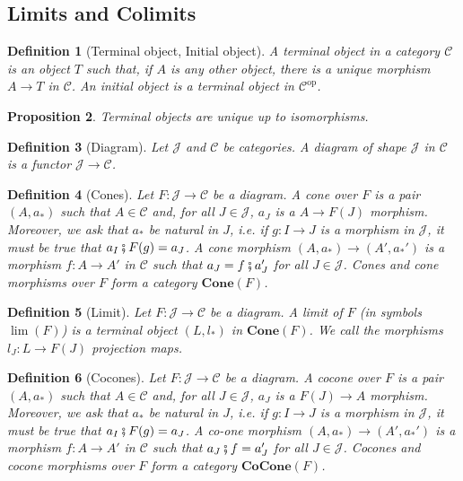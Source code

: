 \documentclass[11pt,a4paper,openright,twoside]{report}
\theoremstyle{plain}
\newtheorem{proposition}{Proposition}
\newtheorem{definition}[proposition]{Definition}
\theoremstyle{definition}
\begin{document}
\subsection{Limits and Colimits}

\begin{definition}[Terminal object, Initial object]
  A terminal object in a category $\mathcal{C}$ is an object $T$ such that, if $A$ is any other object, there is a unique morphism $A \to T$ in $\mathcal{C}$. An initial object is a terminal object in $\mathcal{C}^{\mathrm{op}}$.
\end{definition}

\begin{proposition}
  Terminal objects are unique up to isomorphisms.
\end{proposition}

\begin{definition}[Diagram]
  Let $\mathcal{J}$ and $\mathcal{C}$ be categories. A diagram of shape $\mathcal{J}$ in $\mathcal{C}$ is a functor $\mathcal{J} \to \mathcal{C}$.
\end{definition}

\begin{definition}[Cones]
  Let $F: \mathcal{J} \to \mathcal{C}$ be a diagram. A cone over $F$ is a pair $(A,a_*)$ such that $A \in \mathcal{C}$ and, for all $J \in \mathcal{J}$, $a_J$ is a $A \to F(J)$ morphism. Moreover, we ask that $a_*$ be natural in $J$, i.e. if $g: I \to J$ is a morphism in $\mathcal{J}$, it must be true that $a_I \fatsemi F(g) = a_J$.
  A cone morphism $(A, a_*) \to (A', a_*')$ is a morphism $f: A \to A'$ in $\mathcal{C}$ such that $a_J = f \fatsemi a_J'$ for all $J \in \mathcal{J}$. 
  Cones and cone morphisms over $F$ form a category $\mathbf{Cone}(F)$.
\end{definition}

\begin{definition}[Limit]
  Let $F: \mathcal{J} \to \mathcal{C}$ be a diagram. A limit of $F$ (in symbols $\lim(F)$) is a terminal object $(L, l_{*})$ in $\mathbf{Cone}(F)$. We call the morphisms $l_J: L \to F(J)$ projection maps.
\end{definition}

\begin{definition}[Cocones]
  Let $F: \mathcal{J} \to \mathcal{C}$ be a diagram. A cocone over $F$ is a pair $(A,a_*)$ such that $A \in \mathcal{C}$ and, for all $J \in \mathcal{J}$, $a_J$ is a $F(J) \to A$ morphism. Moreover, we ask that $a_*$ be natural in $J$, i.e. if $g: I \to J$ is a morphism in $\mathcal{J}$, it must be true that $a_I \fatsemi F(g) = a_J$.
  A co-one morphism $(A, a_*) \to (A', a_*')$ is a morphism $f: A \to A'$ in $\mathcal{C}$ such that $a_J \fatsemi f = a_J'$ for all $J \in \mathcal{J}$.
  Cocones and cocone morphisms over $F$ form a category $\mathbf{CoCone}(F)$.
\end{definition}
\end{document}
